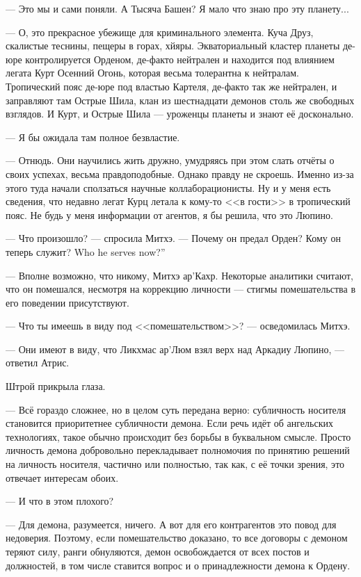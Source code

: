 --- Это мы и сами поняли.
А Тысяча Башен?
Я мало что знаю про эту планету...

--- О, это прекрасное убежище для криминального элемента.
Куча Друз, скалистые теснины, пещеры в горах, хйяры.
Экваториальный кластер планеты де-юре контролируется Орденом, де-факто нейтрален и находится под влиянием легата Курт Осенний Огонь, которая весьма толерантна к нейтралам.
Тропический пояс де-юре под властью Картеля, де-факто так же нейтрален, и заправляют там Острые Шила, клан из шестнадцати демонов столь же свободных взглядов.
И Курт, и Острые Шила --- уроженцы планеты и знают её досконально.

--- Я бы ожидала там полное безвластие.

--- Отнюдь.
Они научились жить дружно, умудряясь при этом слать отчёты о своих успехах, весьма правдоподобные.
Однако правду не скроешь.
Именно из-за этого туда начали сползаться научные коллаборационисты.
Ну и у меня есть сведения, что недавно легат Курц летала к кому-то <<в гости>> в тропический пояс.
Не будь у меня информации от агентов, я бы решила, что это Люпино.

--- Что произошло? --- спросила Митхэ.
--- Почему он предал Орден?
{Кому он теперь служит?}
{Who he serves now?''}

--- Вполне возможно, что никому, Митхэ ар’Кахр.
Некоторые аналитики считают, что он помешался, несмотря на коррекцию личности --- стигмы помешательства в его поведении присутствуют.

--- Что ты имеешь в виду под <<помешательством>>? --- осведомилась Митхэ.

--- Они имеют в виду, что Ликхмас ар'Люм взял верх над Аркадиу Люпино, --- ответил Атрис.

Штрой прикрыла глаза.

--- Всё гораздо сложнее, но в целом суть передана верно: субличность носителя становится приоритетнее субличности демона.
Если речь идёт об ангельских технологиях, такое обычно происходит без борьбы в буквальном смысле.
Просто личность демона добровольно перекладывает полномочия по принятию решений на личность носителя, частично или полностью, так как, с её точки зрения, это отвечает интересам обоих.

--- И что в этом плохого?

--- Для демона, разумеется, ничего.
А вот для его контрагентов это повод для недоверия.
Поэтому, если помешательство доказано, то все договоры с демоном теряют силу, ранги обнуляются, демон освобождается от всех постов и должностей, в том числе ставится вопрос и о принадлежности демона к Ордену.

